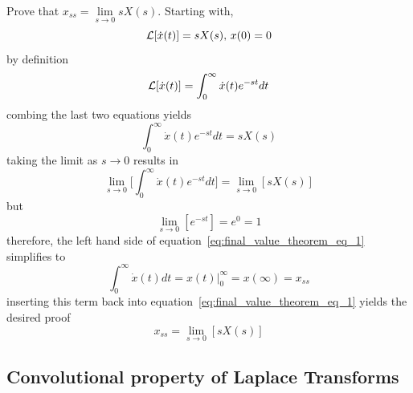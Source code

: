 \documentclass[12pt,letter]{article}
\begin{document}
\begin{bookproof}
Prove that $x_{ss} = \lim\limits_{s\rightarrow 0} s X(s)$. Starting with, 
\begin{equation}
\mathcal{L}{\left[\dot{x}(t)\right]} = s X(s)\text{, } x(0)=0
\end{equation}
by definition
\begin{equation}
\mathcal{L}{\left[\dot{x}(t)\right]} = \int_0^{\infty} \dot{x}(t)e^{-s t}dt
\end{equation}
combing the last two equations yields
\begin{equation}
\int_0^{\infty} \dot{x}(t)e^{-s t}dt = s X(s)
\end{equation}
taking the limit as $s \rightarrow 0$ results in 
\begin{equation}
\lim\limits_{s \rightarrow 0} \bigg[ \int_0^{\infty} \dot{x}(t)e^{-s t}dt \bigg] = \lim\limits_{s \rightarrow 0}[s X(s)]
\label{eq:final_value_theorem_eq_1}
\end{equation}
but
\begin{equation}
\lim\limits_{s \rightarrow 0} [ e^{-s t}] = e^0 = 1
\end{equation}
therefore, the left hand side of equation~\ref{eq:final_value_theorem_eq_1} simplifies to 
\begin{equation}
\int_0^{\infty} \dot{x}(t)dt = x(t)  \big|_{0}^{\infty} = x(\infty) = x_{ss}
\end{equation}
inserting this term back into equation~\ref{eq:final_value_theorem_eq_1} yields the desired proof
\begin{equation}
x_{ss} =  \lim\limits_{s\rightarrow 0} [s X(s)]
\end{equation}

\end{bookproof}


\subsection{Convolutional property of Laplace Transforms}
\end{document}
